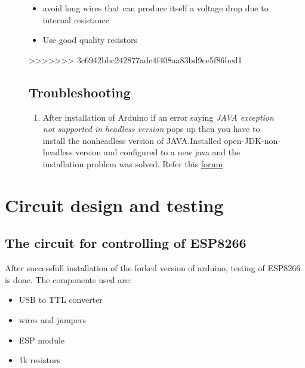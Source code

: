 \documentclass[16pt]{article}
\begin{document}
\begin{figure}
\begin{itemize}

\item
  avoid long wires that can produce itself a voltage drop due to
  internal resistance
\item
  Use good quality resistors
\end{itemize}


>>>>>>> 3c6942bbc242877ade4f408aa83bd9ce5f86bed1

\subsection{Troubleshooting}

\begin{enumerate}

\item
  After installation of Arduino if an error saying \emph{JAVA exception
  not supported in headless version} pops up then you have to install
  the nonheadless version of JAVA.Installed open-JDK-non-headless
  version and configured to a new java and the installation problem was
  solved. Refer this
 \href{http://askubuntu.com/questions/26474/unable-to-install-arduino}{forum}
\end{enumerate}

\end{figure}


\vspace{0.4cm}






\vspace{15cm}

\section{Circuit design and testing}
\subsection{The circuit for controlling of ESP8266}

\vspace{0.5cm}

After successfull installation of the forked version of arduino, testing
of ESP8266 is done. The components used are:

\begin{itemize}

\item
  USB to TTL converter
\item
  wires and jumpers
\item
  ESP module
\item
  1k resistors
\end{itemize}
\end{document}
